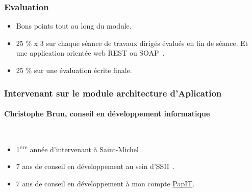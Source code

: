 \documentclass{beamer}
\begin{document}
    \begin{frame}
        \transdissolve
        \frametitle{Evaluation}
        \begin{itemize}
            \item Bons points tout au long du module.
            \item 25 \% x 3 sur chaque séance de travaux dirigés évalués en fin de séance.
            Et une application orientée web REST ou SOAP~.
            \item 25 \% sur une évaluation écrite finale.
        \end{itemize}
    \end{frame}

    \begin{frame}
        \transdissolve
        \frametitle{Intervenant sur le module architecture d'Aplication}
        \framesubtitle{Christophe Brun, conseil en développement informatique}

        \begin{columns}
            \begin{itemize}
                \item 1\textsuperscript{ere} année d'intervenant à Saint-Michel .

                \item 7 ans de conseil en développement au sein d'SSII~.

                \item 7 ans de conseil en développement à mon compte \href{https://papit.fr}{PapIT}.


\end{itemize}
\end{columns}
\end{frame}
\end{document}
